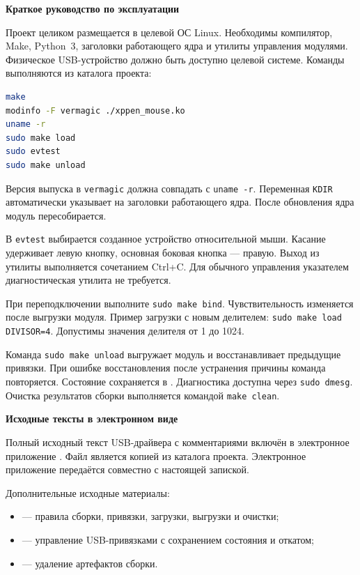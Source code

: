 \begin{center}\textbf{Краткое руководство по эксплуатации}\end{center}

Проект целиком размещается в целевой ОС Linux. Необходимы компилятор, Make, Python~3, заголовки работающего ядра и утилиты управления модулями. Физическое USB-устройство должно быть доступно целевой системе. Команды выполняются из каталога проекта:
\begin{lstlisting}[language=bash,basicstyle=\small\ttfamily]
make
modinfo -F vermagic ./xppen_mouse.ko
uname -r
sudo make load
sudo evtest
sudo make unload
\end{lstlisting}

Версия выпуска в \texttt{vermagic} должна совпадать с \texttt{uname -r}. Переменная \texttt{KDIR} автоматически указывает на заголовки работающего ядра. После обновления ядра модуль пересобирается.

В \texttt{evtest} выбирается созданное устройство относительной мыши. Касание удерживает левую кнопку, основная боковая кнопка --- правую. Выход из утилиты выполняется сочетанием Ctrl+C. Для обычного управления указателем диагностическая утилита не требуется.

При переподключении выполните \texttt{sudo make bind}. Чувствительность изменяется после выгрузки модуля. Пример загрузки с новым делителем: \texttt{sudo make load DIVISOR=4}. Допустимы значения делителя от 1 до 1024.

Команда \texttt{sudo make unload} выгружает модуль и восстанавливает предыдущие привязки. При ошибке восстановления после устранения причины команда повторяется. Состояние сохраняется в . Диагностика доступна через \texttt{sudo dmesg}. Очистка результатов сборки выполняется командой \texttt{make clean}.
\clearpage

\begin{center}\textbf{Исходные тексты в электронном виде}\end{center}

Полный исходный текст USB-драйвера с комментариями включён в электронное приложение . Файл является копией  из каталога проекта. Электронное приложение передаётся совместно с настоящей запиской.

Дополнительные исходные материалы:
\begin{itemize}
\item {} --- правила сборки, привязки, загрузки, выгрузки и очистки;
\item {} --- управление USB-привязками с сохранением состояния и откатом;
\item {} --- удаление артефактов сборки.
\end{itemize}

